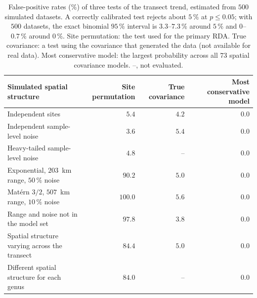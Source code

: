 \begin{table}[htbp]\centering\footnotesize
\caption{False-positive rates (\%) of three tests of the transect trend,
estimated from $500$ simulated datasets. A correctly calibrated test rejects
about $5\,\%$ at $p\leq0.05$; with $500$ datasets, the exact binomial $95\,\%$
interval is $3.3$--$7.3\,\%$ around $5\,\%$ and $0$--$0.7\,\%$ around $0\,\%$.
Site permutation: the test used for the primary RDA. True covariance: a test
using the covariance that generated the data (not available for real data).
Most conservative model: the largest probability across all $73$ spatial
covariance models. --, not evaluated.}
\label{tab:spatial_calibration}
\begin{tabular}{lrrr}\toprule
Simulated spatial structure & Site permutation & True covariance & Most conservative model \\
\midrule
Independent sites & $5.4$ & $4.2$ & $0.0$ \\
Independent sample-level noise & $3.6$ & $5.4$ & $0.0$ \\
Heavy-tailed sample-level noise & $4.8$ & -- & $0.0$ \\
\addlinespace
Exponential, $203$~km range, $50\,\%$ noise & $90.2$ & $5.0$ & $0.0$ \\
Mat\'ern $3/2$, $507$~km range, $10\,\%$ noise & $100.0$ & $5.6$ & $0.0$ \\
Range and noise not in the model set & $97.8$ & $3.8$ & $0.0$ \\
Spatial structure varying across the transect & $84.4$ & $5.0$ & $0.0$ \\
Different spatial structure for each genus & $84.0$ & -- & $0.0$ \\
\bottomrule\end{tabular}\end{table}
